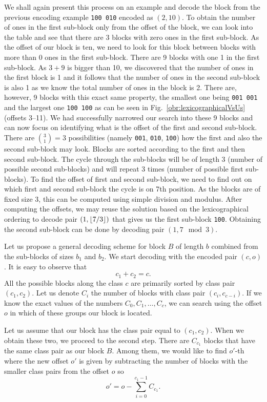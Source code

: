 We shall again present this process on an example and decode the block from the previous
encoding example {\tt 100 010} encoded as $(2, 10)$. To obtain the number of ones in
the first sub-block only from the offset of the block, we can look into the table and
see that there are 3 blocks with zero ones in the first sub-block. As the offset of our
block is ten, we need to look for this block between blocks with more than 0 ones in the
first sub-block. There are 9 blocks with one 1 in the first sub-block. As $3+9$ is bigger
than 10, we discovered that the number of ones in the first block is 1 and it follows that
the number of ones in the second sub-block is also 1 as we know the total number of ones in
the block is 2. There are, however, 9 blocks with this exact same property, the smallest one
being {\tt 001 001} and the largest one {\tt 100 100} as can be seen in
Fig.~\ref{obr:lexicographicalVsUs} (offsets 3--11). We had successfully narrowed our search
into these 9 blocks and can now focus on identifying what is the offset of the first and second
sub-block. There are ${3 \choose 1} = 3$ possibilities (namely {\tt 001}, {\tt 010}, {\tt 100})
how the first and also the second sub-block may look. Blocks are sorted according to the first
and then second sub-block. The cycle through the sub-blocks will be of length 3 (number of
possible second sub-blocks) and will repeat 3 times (number of possible first sub-blocks). To
find the offset of first and second sub-block, we need to find out on which first and second
sub-block the cycle is on 7th position. As the blocks are of fixed size 3, this can be
computed using simple division and modulus. After computing the offsets, we may reuse the
solution based on the lexicographical ordering to decode pair $(1, \left\lfloor 7/3 \right\rfloor)$ that gives us
the first sub-block {\tt 100}. Obtaining the second sub-block can be done by decoding pair
$(1, 7\mod 3)$.

Let us propose a general decoding scheme for block $B$ of length $b$ combined from the
sub-blocks of sizes $b_1$ and $b_2$. We start decoding with the encoded pair $(c, o)$. It is easy
to observe that $$c_1 + c_2 = c.$$ All the possible blocks along the class $c$ are primarily
sorted by class pair $(c_1, c_2)$. Let us denote $C_i$ the number of blocks with class
pair $(c_i, c_{c-i})$. If we know the exact values of the numbers $C_0, C_1, \ldots , C_c$,
we can search using the offset $o$ in which of these groups our block is located.

Let us assume that our block has the class pair equal to $(c_1, c_2)$. When we obtain these two,
we proceed to the second step. There are $C_{c_1}$ blocks that have the same class pair
as our block $B$. Among them, we would like to find $o'$-th where the new offset $o'$
is given by subtracting the number of blocks with the smaller class pairs from the offset
$o$ so $$o' = o - \sum_{i=0}^{c_1-1} C_{c_1}.$$

